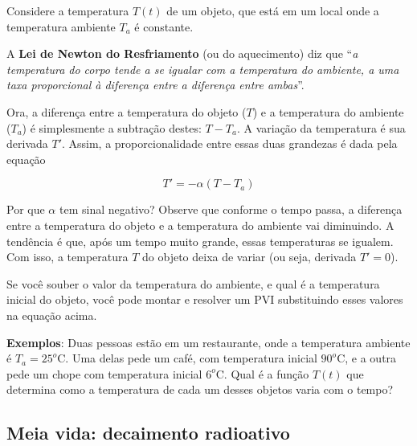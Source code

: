 \documentclass[a4paper]{article}
\begin{document}
Considere a temperatura $T(t)$ de um objeto, que está em um local onde
a temperatura ambiente $T_a$ é constante.

A {\bf Lei de Newton do Resfriamento} (ou do aquecimento) diz que
``{\em a temperatura do corpo tende a se igualar com a temperatura do
  ambiente, a uma taxa proporcional à diferença entre a diferença
  entre ambas}''.

Ora, a diferença entre a temperatura do objeto ($T$) e a temperatura
do ambiente ($T_a$) é simplesmente a subtração destes: $T - T_a$. A
variação da temperatura é sua derivada $T'$. Assim, a
proporcionalidade entre essas duas grandezas é dada pela equação

\begin{displaymath}
  T' = -\alpha(T-T_a)
\end{displaymath}

Por que $\alpha$ tem sinal negativo? Observe que conforme o tempo passa, a
diferença entre a temperatura do objeto e a temperatura do ambiente
vai diminuindo. A tendência é que, após um tempo muito grande, essas
temperaturas se igualem. Com isso, a temperatura $T$ do objeto deixa
de variar (ou seja, derivada $T'=0$).

Se você souber o valor da temperatura do ambiente, e qual é a
temperatura inicial do objeto, você pode montar e resolver um PVI
substituindo esses valores na equação acima.

{\bf Exemplos}: Duas pessoas estão em um restaurante, onde a
temperatura ambiente é $T_a=25^o$C. Uma delas pede um café, com
temperatura inicial $90^o$C, e a outra pede um chope com temperatura
inicial $6^o$C. Qual é a função $T(t)$ que determina como a temperatura de
cada um desses objetos varia com o tempo?


\subsection{Meia vida: decaimento radioativo}
\end{document}

